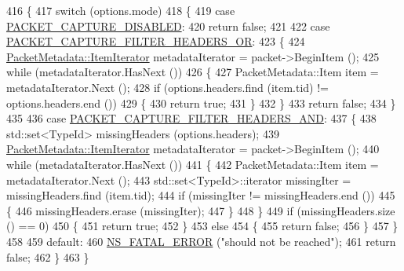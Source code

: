 \begin{DoxyCode}
416 \{
417   \textcolor{keywordflow}{switch} (options.mode)
418     \{
419     \textcolor{keywordflow}{case} \hyperlink{classns3_1_1PyViz_afefded0f19591a14d78d7031573cce86a564be1d28ff75020f21bc0c781637628}{PACKET\_CAPTURE\_DISABLED}:
420       \textcolor{keywordflow}{return} \textcolor{keyword}{false};
421 
422     \textcolor{keywordflow}{case} \hyperlink{classns3_1_1PyViz_afefded0f19591a14d78d7031573cce86a0435550003c45171077674b2c31e27d3}{PACKET\_CAPTURE\_FILTER\_HEADERS\_OR}:
423       \{
424         \hyperlink{classns3_1_1PacketMetadata_a32606143b9dd3fe0db01264200e27783}{PacketMetadata::ItemIterator} metadataIterator = packet->BeginItem ();
425         \textcolor{keywordflow}{while} (metadataIterator.HasNext ())
426           \{
427             PacketMetadata::Item item = metadataIterator.Next ();
428             \textcolor{keywordflow}{if} (options.headers.find (item.tid) != options.headers.end ())
429               \{
430                 \textcolor{keywordflow}{return} \textcolor{keyword}{true};
431               \}
432           \}
433         \textcolor{keywordflow}{return} \textcolor{keyword}{false};
434       \}
435 
436     \textcolor{keywordflow}{case} \hyperlink{classns3_1_1PyViz_afefded0f19591a14d78d7031573cce86a89786eddf385177e4e1a5ea626b3b427}{PACKET\_CAPTURE\_FILTER\_HEADERS\_AND}:
437       \{
438         std::set<TypeId> missingHeaders (options.headers);
439         \hyperlink{classns3_1_1PacketMetadata_a32606143b9dd3fe0db01264200e27783}{PacketMetadata::ItemIterator} metadataIterator = packet->BeginItem ();
440         \textcolor{keywordflow}{while} (metadataIterator.HasNext ())
441           \{
442             PacketMetadata::Item item = metadataIterator.Next ();
443             std::set<TypeId>::iterator missingIter = missingHeaders.find (item.tid);
444             \textcolor{keywordflow}{if} (missingIter != missingHeaders.end ())
445               \{
446                 missingHeaders.erase (missingIter);
447               \}
448           \}
449         \textcolor{keywordflow}{if} (missingHeaders.size () == 0)
450           \{
451             \textcolor{keywordflow}{return} \textcolor{keyword}{true};
452           \}
453         \textcolor{keywordflow}{else}
454           \{
455             \textcolor{keywordflow}{return} \textcolor{keyword}{false};
456           \}
457       \}
458 
459     \textcolor{keywordflow}{default}:
460       \hyperlink{group__fatal_ga5131d5e3f75d7d4cbfd706ac456fdc85}{NS\_FATAL\_ERROR} (\textcolor{stringliteral}{"should not be reached"});
461       \textcolor{keywordflow}{return} \textcolor{keyword}{false};
462     \}
463 \}
\end{DoxyCode}



